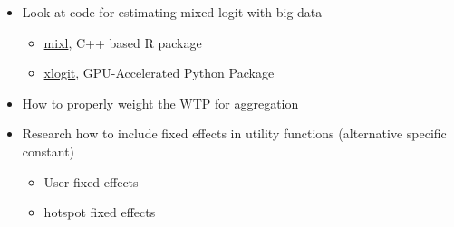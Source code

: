 \documentclass[
  letterpaper,
]{article}
\providecommand{\tightlist}{%
  \setlength{\itemsep}{0pt}\setlength{\parskip}{0pt}}\usepackage{longtable,booktabs,array}
\begin{document}
\begin{tcolorbox}
\begin{enumerate}
  \begin{itemize}
  \tightlist
  \item
    Look at code for estimating mixed logit with big data

    \begin{itemize}
    \tightlist
    \item
      \href{https://github.com/joemolloy/fast-mixed-mnl}{mixl}, C++
      based R package
    \item
      \href{https://xlogit.readthedocs.io/en/latest/index.html}{xlogit},
      GPU-Accelerated Python Package
    \end{itemize}
  \item
    How to properly weight the WTP for aggregation
  \item
    Research how to include fixed effects in utility functions
    (alternative specific constant)

    \begin{itemize}
    \tightlist
    \item
      User fixed effects
    \item
      hotspot fixed effects
    \end{itemize}
  \end{itemize}
\end{enumerate}

\end{tcolorbox}
\end{document}

